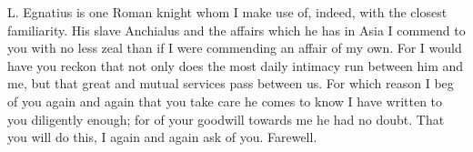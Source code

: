 

L. Egnatius is one Roman knight whom I make use of, indeed, with the closest familiarity. His slave Anchialus and the affairs which he has in Asia I commend to you with no less zeal than if I were commending an affair of my own. For I would have you reckon that not only does the most daily intimacy run between him and me, but that great and mutual services pass between us. For which reason I beg of you again and again that you take care he comes to know I have written to you diligently enough; for of your goodwill towards me he had no doubt. That you will do this, I again and again ask of you. Farewell.
